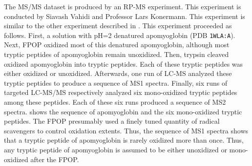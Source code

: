 The \gls{MS/MS} dataset is produced by an \gls{RP-MS} experiment.
This experiment is conducted by Siavash Vahidi and Professor Lars Konermann.
This experiment is similar to the other experiment described in \cite{vahidi2012mapping}.
This experiment proceeded as follows.
First, a solution with pH=2 denatured apomyoglobin (\gls{PDB} \texttt{1WLA:A}).
Next, \gls{FPOP} oxidized most of this denatured apomyoglobin, although most tryptic peptides of apomyoglobin remain unoxidized.
Then, trypsin cleaved oxidized apomyoglobin into tryptic peptides.
Each of these tryptic peptides was either oxidized or unoxidized.
Afterwards, one run of \gls{LC-MS} analyzed these tryptic peptides to produce a sequence of \gls{MS1} spectra.
Finally, six runs of targeted \gls{LC-MS/MS} respectively analyzed six \gls{mono-oxidized} tryptic peptides among these peptides.
Each of these six runs produced a sequence of \gls{MS2} spectra.
 shows the sequence of apomyoglobin and the six \gls{mono-oxidized} tryptic peptides.
The \gls{FPOP} presumably used a finely tuned quantity of radical scavengers to control oxidation extents.
Thus, the sequence of \gls{MS1} spectra shows that a tryptic peptide of apomyoglobin is rarely oxidized more than once.
Thus, any tryptic peptide of apomyoglobin is assumed to be either unoxidized or \gls{mono-oxidized} after the \gls{FPOP}.
